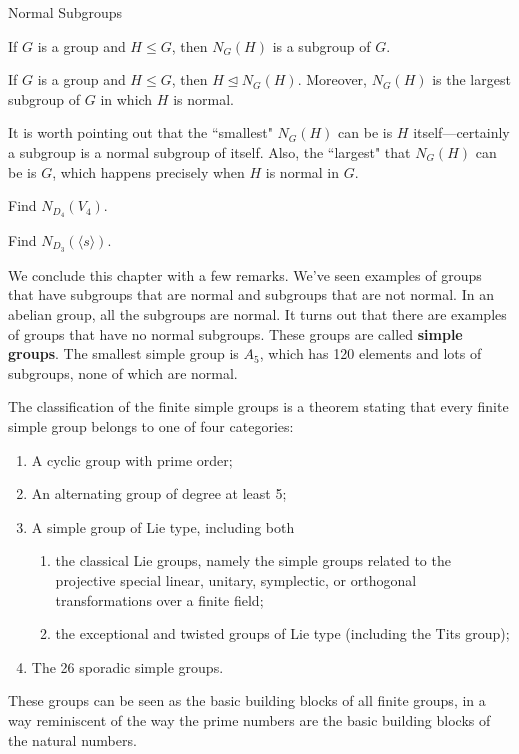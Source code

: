\begin{section}{Normal Subgroups}
\begin{theorem}
If $G$ is a group and $H\leq G$, then $N_G(H)$ is a subgroup of $G$.
\end{theorem}

\begin{theorem}
If $G$ is a group and $H\leq G$, then $H\trianglelefteq N_G(H)$.  Moreover, $N_G(H)$ is the largest subgroup of $G$ in which $H$ is normal. 
\end{theorem}

It is worth pointing out that the ``smallest" $N_G(H)$ can be is $H$ itself---certainly a subgroup is a normal subgroup of itself.  Also, the ``largest" that $N_G(H)$ can be is $G$, which happens precisely when $H$ is normal in $G$.

\begin{exercise}
Find $N_{D_4}(V_4)$.
\end{exercise}

\begin{exercise}
Find $N_{D_3}(\langle s\rangle)$.
\end{exercise}

We conclude this chapter with a few remarks.  We've seen examples of groups that have subgroups that are normal and subgroups that are not normal.  In an abelian group, all the subgroups are normal.  It turns out that there are examples of groups that have no normal subgroups.  These groups are called \textbf{simple groups}.  The smallest simple group is $A_5$, which has 120 elements and lots of subgroups, none of which are normal.


The classification of the finite simple groups is a theorem stating that every finite simple group belongs to one of four categories:
\begin{enumerate}
\item A cyclic group with prime order;
\item An alternating group of degree at least 5;
\item A simple group of Lie type, including both 
\begin{enumerate}
\item the classical Lie groups, namely the simple groups related to the projective special linear, unitary, symplectic, or orthogonal transformations over a finite field;
\item the exceptional and twisted groups of Lie type (including the Tits group);
\end{enumerate}
\item The 26 sporadic simple groups.
\end{enumerate}
These groups can be seen as the basic building blocks of all finite groups, in a way reminiscent of the way the prime numbers are the basic building blocks of the natural numbers.


\end{section}
